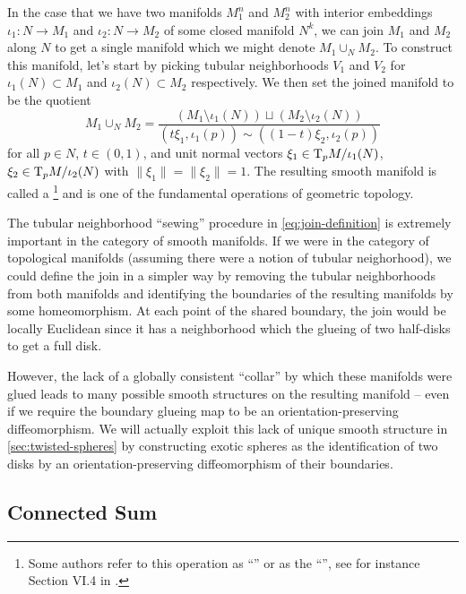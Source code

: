 In the case that we have two manifolds $M_1^n$ and $M_2^n$ with interior embeddings $\iota_1 : N \to M_1$ and $\iota_2 : N\to M_2$ of some closed manifold $N^k$, we can join $M_1$ and $M_2$ along $N$ to get a single manifold which we might denote $M_1\cup_N M_2$.
To construct this manifold, let's start by picking tubular neighborhoods $V_1$ and $V_2$ for $\iota_1(N)\subset M_1$ and $\iota_2(N)\subset M_2$ respectively. We then set the joined manifold to be the quotient
\begin{equation}\label{eq:join-definition}
	M_1\cup_N M_2 = \frac{(M_1\setminus \iota_1(N))\sqcup (M_2\setminus \iota_2(N))}{(t\xi_1, \iota_1(p)) \sim ((1-t)\xi_2, \iota_2(p))}
\end{equation}
for all $p\in N$, $t\in(0,1)$, and unit normal vectors $\xi_1\in \mathrm{T}_p M/\iota_1(N)$, $\xi_2\in \mathrm{T}_p M/\iota_2(N)$ with $\|\xi_1\|=\|\xi_2\|=1$. The resulting smooth manifold is called a \footnote{Some authors refer to this operation as ``'' or as the ``'', see for instance Section VI.4 in \cite{kosinski1993differential}.} and is one of the fundamental operations of geometric topology.

\begin{remark}
	The tubular neighborhood ``sewing'' procedure in \cref{eq:join-definition} is extremely important in the category of smooth manifolds. If we were in the category of topological manifolds (assuming there were a notion of tubular neighorhood), we could define the join in a simpler way by removing the tubular neighborhoods from both manifolds and identifying the boundaries of the resulting manifolds by some homeomorphism. At each point of the shared boundary, the join would be locally Euclidean since it has a neighborhood which the glueing of two half-disks to get a full disk.

	However, the lack of a globally consistent ``collar'' by which these manifolds were glued leads to many possible smooth structures on the resulting manifold -- even if we require the boundary glueing map to be an orientation-preserving diffeomorphism. We will actually exploit this lack of unique smooth structure in \cref{sec:twisted-spheres} by constructing exotic spheres as the identification of two disks by an orientation-preserving diffeomorphism of their boundaries.
\end{remark}

\subsection{Connected Sum}

